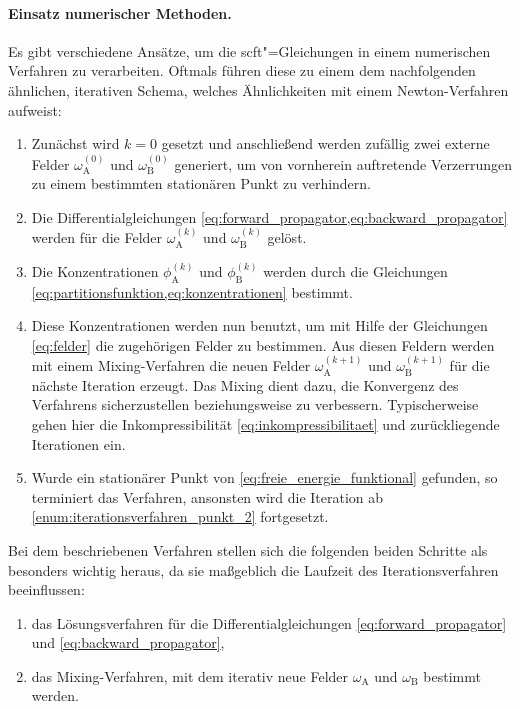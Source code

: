 \documentclass[../main.tex]{subfiles}
\begin{document}
\paragraph{Einsatz numerischer Methoden.} %

Es gibt verschiedene Ansätze, um die \ac{scft}"=Gleichungen in einem numerischen Verfahren zu verarbeiten.
Oftmals führen diese zu einem dem nachfolgenden ähnlichen, iterativen Schema, welches Ähnlichkeiten mit einem Newton-Verfahren aufweist:

\begin{enumerate}[label={\itshape\roman*.},ref={\itshape\roman*}]
    \item Zunächst wird $k = 0$ gesetzt und anschließend werden zufällig zwei externe Felder $\omega^{(0)}_{\mathrm{A}}$ und $\omega^{(0)}_{\mathrm{B}}$ generiert, um von vornherein auftretende Verzerrungen zu einem bestimmten stationären Punkt zu verhindern.
    \item\label{enum:iterationsverfahren_punkt_2} Die Differentialgleichungen \cref{eq:forward_propagator,eq:backward_propagator} werden für die Felder $\omega^{(k)}_{\mathrm{A}}$ und $\omega^{(k)}_{\mathrm{B}}$ gelöst.
    \item Die Konzentrationen $\phi^{(k)}_{\mathrm{A}}$ und $\phi^{(k)}_{\mathrm{B}}$ werden durch die Gleichungen \cref{eq:partitionsfunktion,eq:konzentrationen} bestimmt.
    \item Diese Konzentrationen werden nun benutzt, um mit Hilfe der Gleichungen \cref{eq:felder} die zugehörigen Felder zu bestimmen.
    Aus diesen Feldern werden mit einem Mixing-Verfahren die neuen Felder $\omega^{(k+1)}_{\mathrm{A}}$ und $\omega^{(k+1)}_{\mathrm{B}}$ für die nächste Iteration erzeugt.
    Das Mixing dient dazu, die Konvergenz des Verfahrens sicherzustellen beziehungsweise zu verbessern.
    Typischerweise gehen hier die Inkompressibilität \cref{eq:inkompressibilitaet} und zurückliegende Iterationen ein.
    \item Wurde ein stationärer Punkt von \cref{eq:freie_energie_funktional} gefunden, so terminiert das Verfahren, ansonsten wird die Iteration ab \cref{enum:iterationsverfahren_punkt_2} fortgesetzt.
\end{enumerate}
%
Bei dem beschriebenen Verfahren stellen sich die folgenden beiden Schritte als besonders wichtig heraus, da sie maßgeblich die Laufzeit des Iterationsverfahren beeinflussen:
\begin{enumerate}[label={\itshape\roman*.}]
    \item das Lösungsverfahren für die Differentialgleichungen \cref{eq:forward_propagator} und \cref{eq:backward_propagator},
    \item das Mixing-Verfahren, mit dem iterativ neue Felder $\omega_{\mathrm{A}}$ und $\omega_{\mathrm{B}}$ bestimmt werden.
\end{enumerate}
\end{document}
